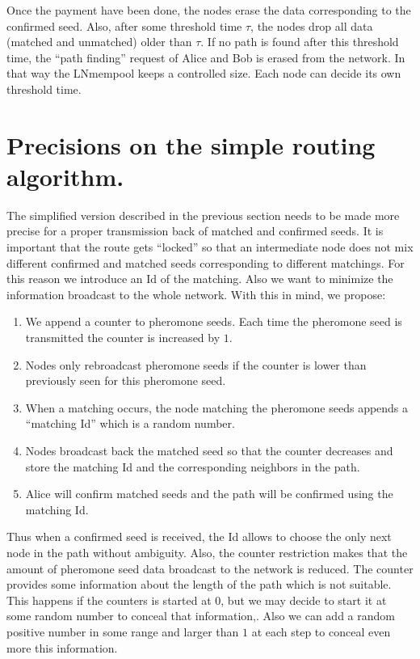 \documentclass[12pt]{amsart}
\theoremstyle{remark}
\begin{document}
Once the payment have been done, the nodes erase the data corresponding to the confirmed seed. 
Also, after some threshold time $\tau$, the nodes drop all data (matched and unmatched) older than $\tau$.
If no path is found after this threshold time, the ``path finding'' request of Alice and Bob is erased 
from the network. In that way the LNmempool keeps a controlled size. 
Each node can decide its own threshold time.

\section{Precisions on the simple routing algorithm.}

The simplified version described in the previous section needs to be made more precise for a proper transmission back of 
matched and confirmed seeds. It is important that the route gets ``locked'' so that an intermediate node does not mix different 
confirmed and matched seeds corresponding to different matchings. For this reason we introduce an Id of the matching. 
Also we want to minimize the information broadcast to the whole network. With this in mind,
we propose:

\begin{enumerate}
 \item We append a counter to pheromone seeds. Each time the pheromone seed is transmitted the counter is increased by $1$.
 \item Nodes only rebroadcast pheromone seeds if the counter is lower than previously seen for this pheromone seed.
 \item When a matching occurs, the node matching the pheromone seeds appends a ``matching Id'' which is a random number.
 \item Nodes broadcast back the matched seed so that the counter decreases and store the matching Id and the corresponding neighbors in the path. 
 \item Alice will confirm matched seeds and the path will be confirmed using the matching Id.
\end{enumerate}

Thus when a confirmed seed is received, the Id allows to choose the only next node in the path without ambiguity. 
Also, the counter restriction makes that the amount of pheromone seed data broadcast to the network is reduced. 
The counter provides some information about the length of the path which is not suitable. This happens if
the counters is started at $0$, but we may decide to start it at some random number to conceal that information,. Also we can add a random positive number in some range and 
larger than $1$ at each step to conceal even more this information. 
\end{document}
